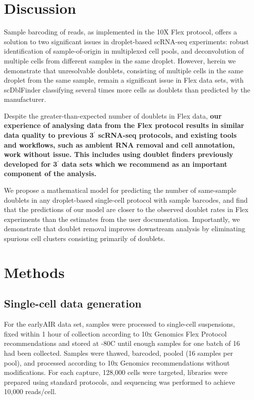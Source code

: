 \documentclass[unnumsec,webpdf,modern,large]{oup-authoring-template}
\begin{document}
	 	\section{Discussion}
	\label{sec:discussion}
	
	Sample barcoding of reads, as implemented in the 10X Flex protocol, offers a solution to two significant issues in droplet-based scRNA-seq experiments: robust identification of sample-of-origin in multiplexed cell pools, and deconvolution of multiple cells from different samples in the same droplet. 
	However, herein we demonstrate that unresolvable doublets, consisting of multiple cells in the same droplet from the same sample, remain a significant issue in Flex data sets, with scDblFinder classifying several times more cells as doublets than predicted by the manufacturer. 
	
	Despite the greater-than-expected number of doublets in Flex data, \textbf{our experience of analysing data from the Flex protocol results in similar data quality to previous 3$^\prime$  scRNA-seq protocols, and existing tools and workflows, such as ambient RNA removal and cell annotation, work without issue. 
	This includes using doublet finders previously developed for 3$^\prime$ data sets which we recommend as an important component of the analysis.}
			
	We propose a mathematical model for predicting the number of same-sample doublets in any droplet-based single-cell protocol with sample barcodes, and find that the predictions of our model are closer to the observed doublet rates in Flex experiments than the estimates from the user documentation. 
	Importantly, we demonstrate that doublet removal improves downstream analysis by eliminating spurious cell clusters consisting primarily of doublets.
	
	\section{Methods}
	\label{sec:methods}
	
	\subsection{Single-cell data generation}
	\label{subsec:data_generation}
	
	For the earlyAIR data set, samples were processed to single-cell suspensions, fixed within 1 hour of collection according to 10x Genomics Flex Protocol recommendations 
	\citep{10X_flex_protocol}
	and stored at -80C until enough samples for one batch of 16 had been collected. 
	Samples were thawed, barcoded, pooled (16 samples per pool), and processed according to 10x Genomics recommendations without modifications. For each capture, 128,000 cells were targeted, libraries were prepared using standard protocols, and sequencing was performed to achieve 10,000 reads/cell.	
	
\end{document}
